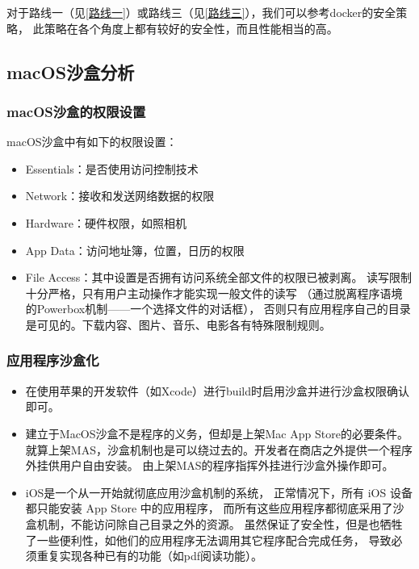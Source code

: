 \documentclass[AutoFakeBold,a4paper]{ctexart}
\begin{document}
对于路线一（见\ref{路线一}）或路线三（见\ref{路线三}），我们可以参考docker的安全策略，
此策略在各个角度上都有较好的安全性，而且性能相当的高。

\subsection{macOS沙盒分析}

\subsubsection{macOS沙盒的权限设置}

macOS沙盒中有如下的权限设置：

\begin{itemize}
    \item Essentials：是否使用访问控制技术
    \item Network：接收和发送网络数据的权限
    \item Hardware：硬件权限，如照相机
    \item App Data：访问地址簿，位置，日历的权限
    \item File Access：其中设置是否拥有访问系统全部文件的权限已被剥离。
    读写限制十分严格，只有用户主动操作才能实现一般文件的读写
    （通过脱离程序语境的Powerbox机制——一个选择文件的对话框），
    否则只有应用程序自己的目录是可见的。下载内容、图片、音乐、电影各有特殊限制规则。
\end{itemize}

\subsubsection{应用程序沙盒化}

\begin{itemize}
    \item 在使用苹果的开发软件（如Xcode）进行build时启用沙盒并进行沙盒权限确认即可。
    \item 建立于MacOS沙盒不是程序的义务，但却是上架Mac App Store的必要条件。
    就算上架MAS，沙盒机制也是可以绕过去的。开发者在商店之外提供一个程序外挂供用户自由安装。
    由上架MAS的程序指挥外挂进行沙盒外操作即可。
    \item iOS是一个从一开始就彻底应用沙盒机制的系统，
    正常情况下，所有 iOS 设备都只能安装 App Store 中的应用程序，
    而所有这些应用程序都彻底采用了沙盒机制，不能访问除自己目录之外的资源。
    虽然保证了安全性，但是也牺牲了一些便利性，如他们的应用程序无法调用其它程序配合完成任务，
    导致必须重复实现各种已有的功能（如pdf阅读功能）。
\end{itemize}
\end{document}
